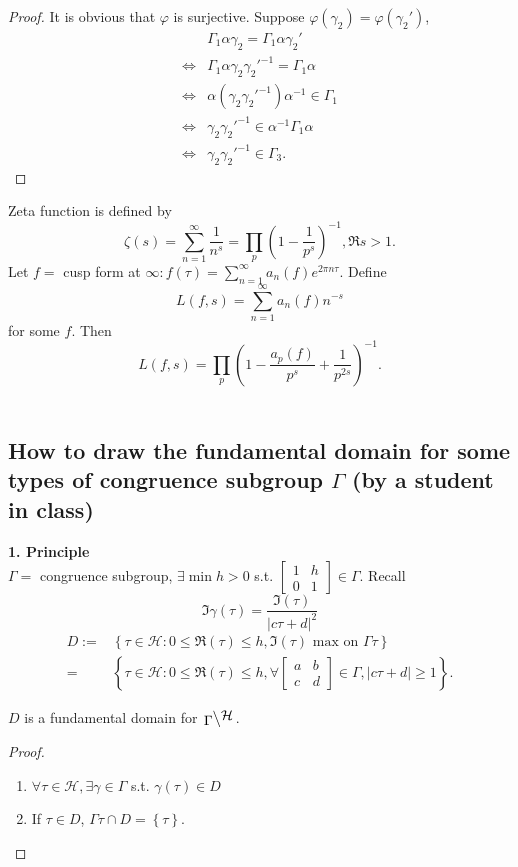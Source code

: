 \begin{proof}
  It is obvious that $\varphi$ is surjective. Suppose $\varphi(\gamma_2)=\varphi(\gamma_2')$,
  \begin{align*}
    & \Gamma_1\alpha \gamma_2=\Gamma_1\alpha \gamma_2'\\
    \Leftrightarrow&\Gamma_1\alpha\gamma_2\gamma_2'^{-1}=\Gamma_1\alpha\\
    \Leftrightarrow& \alpha(\gamma_2\gamma_2'^{-1})\alpha^{-1}\in \Gamma_1\\
    \Leftrightarrow&\gamma_2\gamma_2'^{-1}\in \alpha^{-1}\Gamma_1\alpha\\
    \Leftrightarrow&\gamma_2\gamma_2'^{-1}\in \Gamma_3
  .\end{align*}
\end{proof}

Zeta function is defined by
\[
  \zeta(s)=\sum_{n=1}^{\infty} \frac{1}{n^{s}}=\prod_{p}\left( 1-\frac{1}{p^{s}} \right) ^{-1}, \Re s>1.
\] 
Let $f=$ cusp form at $\infty:f(\tau )=\sum_{n=1}^{\infty} a_n(f)e^{2\pi n\tau }$. Define
\[
  L(f,s)=\sum_{n=1}^{\infty} a_n(f) n^{-s}
\] 
for some $f$. Then 
\[
  L(f,s)=\prod_{p}\left( 1- \frac{a_p(f)}{p^{s}}+\frac{1}{p^{2s}} \right) ^{-1}.
\] 
\\
\subsection{How to draw the fundamental domain for some types of congruence subgroup $\Gamma$ (by a student in class)}
 
\textbf{1. Principle}\\
$\Gamma=$ congruence subgroup, $\exists \min h>0$ s.t. $\begin{bmatrix} 1&h\\0&1 \end{bmatrix} \in \Gamma$. Recall 
    \[
      \Im \gamma(\tau )=\frac{\Im(\tau) }{|c\tau +d|^2}
    \]
    \begin{align*}
      D:=&\left\{\tau \in \mathcal{H}:0\le \Re(\tau) \le h, \Im(\tau)  \text{ max on }\Gamma\tau  \right\} \\
      =&\left\{\tau  \in \mathcal{H}:0\le \Re(\tau )\le h, \forall \begin{bmatrix} a&b\\c&d \end{bmatrix} \in \Gamma,|c\tau +d|\ge 1\right\} .
    \end{align*} 

\begin{proposition}
  $D$ is a fundamental domain for $\bsfrac{\Gamma}{\mathcal{H}}$.
\end{proposition}
\begin{proof}
  \begin{enumerate}
       \item $\forall \tau \in \mathcal{H},\exists \gamma\in \Gamma$ s.t. $\gamma(\tau )\in D$
       \item If $\tau \in D$, $\Gamma\tau \cap D=\left\{\tau \right\} $.
  \end{enumerate}
\end{proof}

